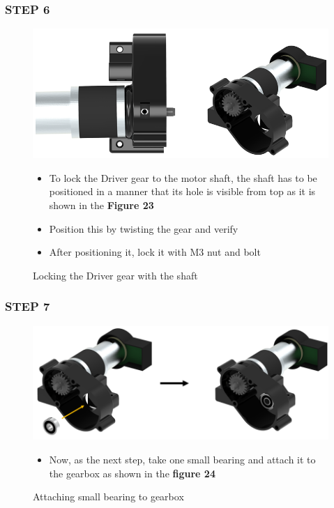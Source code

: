 \documentclass[12pt,a4paper,oneside]{book}
\begin{document}
			\subsubsection*{STEP 6}
				\begin{figure}[H]
					\begin{center}
						\includegraphics[scale=0.6]{ATTACHED DRIVER GEAR TO MOTOR SHAFT}
						\caption{Locking the Driver gear with the shaft}
					\end{center}
					\begin{itemize}
						\item To lock the Driver gear to the motor shaft, the shaft has to be positioned in a manner that its hole is visible from top as it is shown in the \textbf{Figure 23}
						\item Position this by twisting the gear and verify
						\item After positioning it, lock it with M3 nut and bolt
					\end{itemize}
				\end{figure}
				
			\subsubsection*{STEP 7}
				\begin{figure}[H]
					\begin{center}
						\includegraphics[scale=0.55]{ATTACHING BACK BEARING TO GEARBOX}
						\caption{Attaching small bearing to gearbox}
					\end{center}
					\begin{itemize}
						\item Now, as the next step, take one small bearing and attach it to the gearbox as shown in the \textbf{figure 24}
					\end{itemize}
				\end{figure}
				
\end{document}
